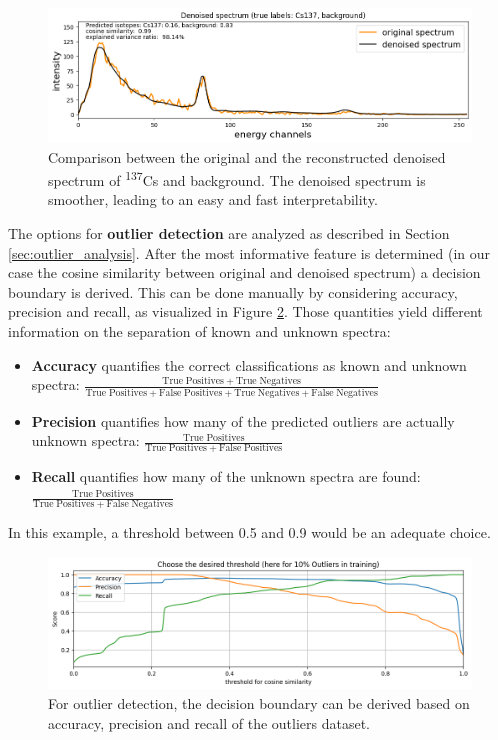 \documentclass[review, 12pt, a4paper]{elsarticle}
\begin{document}
\begin{figure}
\includegraphics[width=\textwidth]{Denoised_Cs137.png}
\caption{Comparison between the original and the reconstructed denoised spectrum of \textsuperscript{137}Cs and background. The denoised spectrum is smoother, leading to an easy and fast interpretability.}
\label{fig:denoised_spectrum}
\end{figure}

The options for \textbf{outlier detection} are analyzed as described in Section \ref{sec:outlier_analysis}. After the most informative feature is determined (in our case the cosine similarity between original and denoised spectrum) a decision boundary is derived. This can be done manually by considering accuracy, precision and recall, as visualized in Figure \ref{fig:outlier}. Those quantities yield different information on the separation of known and unknown spectra:
\begin{itemize}
\item \textbf{Accuracy} quantifies the correct classifications as known and unknown spectra: $\frac{\mathrm{True\;Positives + True\;Negatives}}{\mathrm{True\;Positives + False\;Positives + True\;Negatives + False\;Negatives}}$
\item \textbf{Precision} quantifies how many of the predicted outliers are actually unknown spectra: $\frac{\mathrm{True\;Positives}}{\mathrm{True\;Positives + False\;Positives}}$
\item \textbf{Recall} quantifies how many of the unknown spectra are found: \\$\frac{\mathrm{True\;Positives}}{\mathrm{True\;Positives + False\;Negatives}}$
\end{itemize}
In this example, a threshold between 0.5 and 0.9 would be an adequate choice. 

\begin{figure}
\includegraphics[width=\textwidth]{outlier_accuracy_precision_recall.png}
\caption{For outlier detection, the decision boundary can be derived based on accuracy, precision and recall of the outliers dataset. }
\label{fig:outlier}
\end{figure}
\end{document}
